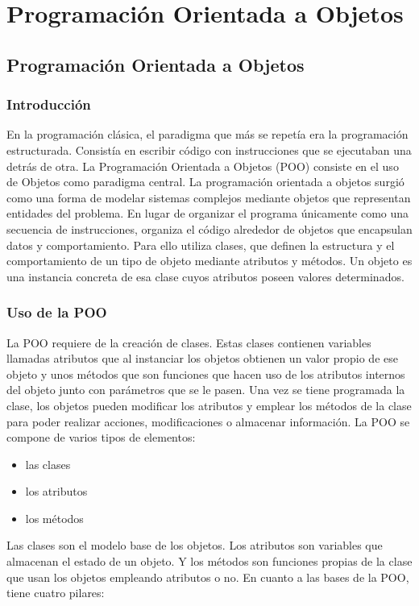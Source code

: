 \documentclass[11pt,a5paper,twoside]{book}
\begin{document}
\chapter{Programación Orientada a Objetos}

\section{Programación Orientada a Objetos}
\subsection{Introducción}
En la programación clásica, el paradigma que más se repetía era la programación estructurada. Consistía en escribir código con instrucciones que se ejecutaban una detrás de otra. La Programación Orientada a Objetos (POO) consiste en el uso de Objetos como paradigma central. 
La programación orientada a objetos surgió como una forma de modelar sistemas complejos mediante objetos que representan entidades del problema. En lugar de organizar el programa únicamente como una secuencia de instrucciones, organiza el código alrededor de objetos que encapsulan datos y comportamiento.
Para ello utiliza clases, que definen la estructura y el comportamiento de un tipo de objeto mediante atributos y métodos. Un objeto es una instancia concreta de esa clase cuyos atributos poseen valores determinados.
\subsection{Uso de la POO}
La POO requiere de la creación de clases. Estas clases contienen variables llamadas atributos que al instanciar los objetos obtienen un valor propio de ese objeto y unos métodos que son funciones que hacen uso de los atributos internos del objeto junto con parámetros que se le pasen.
Una vez se tiene programada la clase, los objetos pueden modificar los atributos y emplear los métodos de la clase para poder realizar acciones, modificaciones o almacenar información.
La POO se compone de varios tipos de elementos:

\begin{itemize}
\item  las clases
\item  los atributos
\item  los métodos
\end{itemize}
Las clases son el modelo base de los objetos. Los atributos son variables que almacenan el estado de un objeto. Y los métodos son funciones propias de la clase que usan los objetos empleando atributos o no.
En cuanto a las bases de la POO, tiene cuatro pilares:
\end{document}

